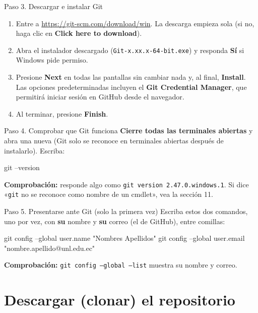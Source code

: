 \documentclass[11pt,a4paper]{article}
\newenvironment{terminal}{\begin{tcolorbox}[terminal]}{\end{tcolorbox}}
\newcommand{\cmd}[1]{\texttt{\textcolor{petroleo}{#1}}}
\begin{document}
\begin{paso}{Paso 3. Descargar e instalar Git}
\begin{enumerate}[leftmargin=*]
  \item Entre a \url{https://git-scm.com/download/win}. La descarga empieza sola (si no, haga clic en \textbf{Click here to download}).
  \item Abra el instalador descargado (\texttt{Git-x.xx.x-64-bit.exe}) y responda \textbf{Sí} si Windows pide permiso.
  \item Presione \textbf{Next} en todas las pantallas sin cambiar nada y, al final, \textbf{Install}. Las opciones predeterminadas incluyen el \textbf{Git Credential Manager}, que permitirá iniciar sesión en GitHub desde el navegador.
  \item Al terminar, presione \textbf{Finish}.
\end{enumerate}
\end{paso}

\begin{paso}{Paso 4. Comprobar que Git funciona}
\textbf{Cierre todas las terminales abiertas} y abra una nueva (Git solo se reconoce en terminales abiertas después de instalarlo). Escriba:
\begin{terminal}
\begin{comando}
git --version
\end{comando}
\end{terminal}
\textbf{Comprobación:} responde algo como \texttt{git version 2.47.0.windows.1}. Si dice «\texttt{git} no se reconoce como nombre de un cmdlet», vea la sección 11.
\end{paso}

\begin{paso}{Paso 5. Presentarse ante Git (solo la primera vez)}
Escriba estos dos comandos, uno por vez, con \textbf{su} nombre y \textbf{su} correo (el de GitHub), entre comillas:
\begin{terminal}
\begin{comando}
git config --global user.name "Nombres Apellidos"
git config --global user.email "nombre.apellido@unl.edu.ec"
\end{comando}
\end{terminal}
\textbf{Comprobación:} \cmd{git config --global --list} muestra su nombre y correo.
\end{paso}

\section{Descargar (clonar) el repositorio}
\end{document}
